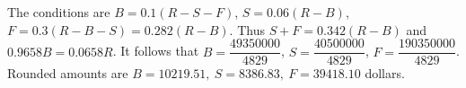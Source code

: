 The conditions are $B=0.1(R-S-F)$, $S=0.06(R-B)$, $F=0.3(R-B-S)=0.282(R-B)$. Thus $S+F=0.342(R-B)$ and $0.9658B=0.0658R$. It follows that $B=\dfrac{49350000}{4829}$, $S=\dfrac{40500000}{4829}$, $F=\dfrac{190350000}{4829}$. Rounded amounts are $\boxed{B=10219.51,\ S=8386.83,\ F=39418.10}$ dollars.
